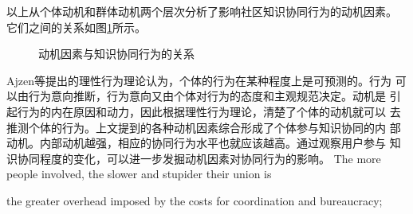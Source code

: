 以上从个体动机和群体动机两个层次分析了影响社区知识协同行为的动机因素。
它们之间的关系如图\ref{fig:motivation}所示。
\begin{figure}
   \label{fig:motivation}
    \centering
    \caption{\small{动机因素与知识协同行为的关系}}
  \end{figure}

Ajzen等提出的理性行为理论认为，个体的行为在某种程度上是可预测的。行为
可以由行为意向推断，行为意向又由个体对行为的态度和主观规范决定。动机是
引起行为的内在原因和动力，因此根据理性行为理论，清楚了个体的动机就可以
去推测个体的行为。上文提到的各种动机因素综合形成了个体参与知识协同的内
部动机。内部动机越强，相应的协同行为水平也就应该越高。通过观察用户参与
知识协同程度的变化，可以进一步发掘动机因素对协同行为的影响。
The more
people involved, the slower and stupider their union is

the greater overhead imposed by the costs for coordination and
bureaucracy;
